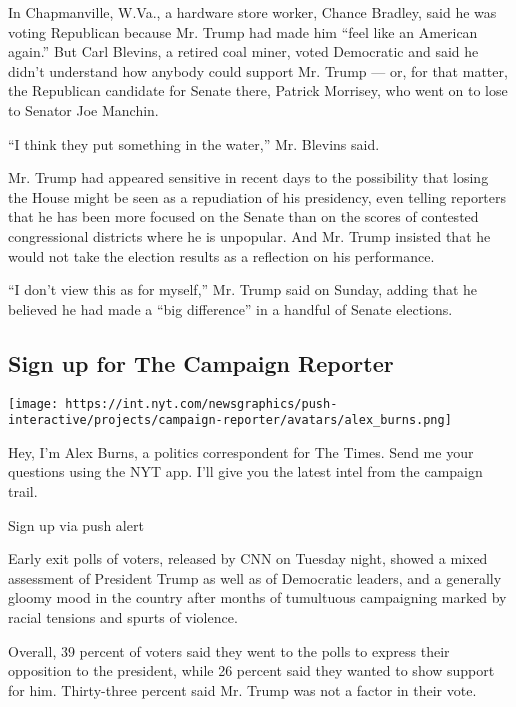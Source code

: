 In Chapmanville, W.Va., a hardware store worker, Chance Bradley, said he
was voting Republican because Mr. Trump had made him ``feel like an
American again.'' But Carl Blevins, a retired coal miner, voted
Democratic and said he didn't understand how anybody could support Mr.
Trump --- or, for that matter, the Republican candidate for Senate
there, Patrick Morrisey, who went on to lose to Senator Joe Manchin.

``I think they put something in the water,'' Mr. Blevins said.

Mr. Trump had appeared sensitive in recent days to the possibility that
losing the House might be seen as a repudiation of his presidency, even
telling reporters that he has been more focused on the Senate than on
the scores of contested congressional districts where he is unpopular.
And Mr. Trump insisted that he would not take the election results as a
reflection on his performance.

``I don't view this as for myself,'' Mr. Trump said on Sunday, adding
that he believed he had made a ``big difference'' in a handful of Senate
elections.

\href{https://www.nytimes.com/interactive/2018/09/28/us/politics/the-campaign-reporter-ul.html?src=hpPromoHeadline}{}

\hypertarget{sign-up-for-the-campaign-reporter}{%
\subsection{Sign up for The Campaign
Reporter}\label{sign-up-for-the-campaign-reporter}}

\texttt{[image: https://int.nyt.com/newsgraphics/push-interactive/projects/campaign-reporter/avatars/alex\_burns.png]}

Hey, I'm Alex Burns, a politics correspondent for The Times. Send me
your questions using the NYT app. I'll give you the latest intel from
the campaign trail.

Sign up via push alert

Early exit polls of voters, released by CNN on Tuesday night, showed a
mixed assessment of President Trump as well as of Democratic leaders,
and a generally gloomy mood in the country after months of tumultuous
campaigning marked by racial tensions and spurts of violence.

Overall, 39 percent of voters said they went to the polls to express
their opposition to the president, while 26 percent said they wanted to
show support for him. Thirty-three percent said Mr. Trump was not a
factor in their vote.

